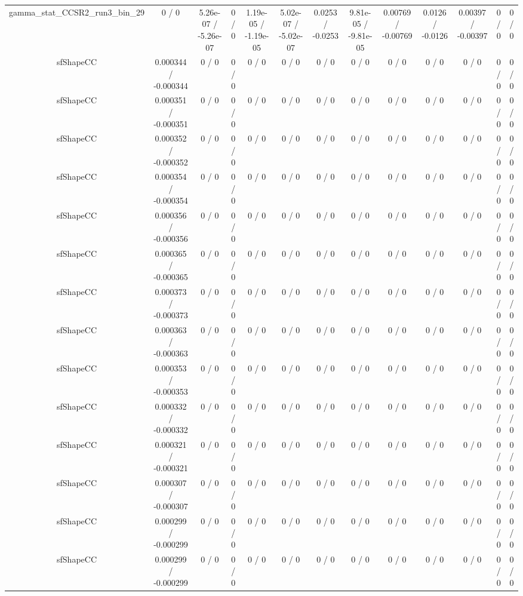 \documentclass[10pt]{article}
\begin{document}
\begin{table}[htbp]
\begin{center}
\begin{tabular}{|c|c|c|c|c|c|c|c|c|c|c|c|c|}
  gamma_stat_CCSR2_run3_bin_29 & 0 / 0 & 5.26e-07 / -5.26e-07 & 0 / 0 & 1.19e-05 / -1.19e-05 & 5.02e-07 / -5.02e-07 & 0.0253 / -0.0253 & 9.81e-05 / -9.81e-05 & 0.00769 / -0.00769 & 0.0126 / -0.0126 & 0.00397 / -0.00397 & 0 / 0 & 0 / 0 \\ 
  sfShapeCC & 0.000344 / -0.000344 & 0 / 0 & 0 / 0 & 0 / 0 & 0 / 0 & 0 / 0 & 0 / 0 & 0 / 0 & 0 / 0 & 0 / 0 & 0 / 0 & 0 / 0 \\ 
  sfShapeCC & 0.000351 / -0.000351 & 0 / 0 & 0 / 0 & 0 / 0 & 0 / 0 & 0 / 0 & 0 / 0 & 0 / 0 & 0 / 0 & 0 / 0 & 0 / 0 & 0 / 0 \\ 
  sfShapeCC & 0.000352 / -0.000352 & 0 / 0 & 0 / 0 & 0 / 0 & 0 / 0 & 0 / 0 & 0 / 0 & 0 / 0 & 0 / 0 & 0 / 0 & 0 / 0 & 0 / 0 \\ 
  sfShapeCC & 0.000354 / -0.000354 & 0 / 0 & 0 / 0 & 0 / 0 & 0 / 0 & 0 / 0 & 0 / 0 & 0 / 0 & 0 / 0 & 0 / 0 & 0 / 0 & 0 / 0 \\ 
  sfShapeCC & 0.000356 / -0.000356 & 0 / 0 & 0 / 0 & 0 / 0 & 0 / 0 & 0 / 0 & 0 / 0 & 0 / 0 & 0 / 0 & 0 / 0 & 0 / 0 & 0 / 0 \\ 
  sfShapeCC & 0.000365 / -0.000365 & 0 / 0 & 0 / 0 & 0 / 0 & 0 / 0 & 0 / 0 & 0 / 0 & 0 / 0 & 0 / 0 & 0 / 0 & 0 / 0 & 0 / 0 \\ 
  sfShapeCC & 0.000373 / -0.000373 & 0 / 0 & 0 / 0 & 0 / 0 & 0 / 0 & 0 / 0 & 0 / 0 & 0 / 0 & 0 / 0 & 0 / 0 & 0 / 0 & 0 / 0 \\ 
  sfShapeCC & 0.000363 / -0.000363 & 0 / 0 & 0 / 0 & 0 / 0 & 0 / 0 & 0 / 0 & 0 / 0 & 0 / 0 & 0 / 0 & 0 / 0 & 0 / 0 & 0 / 0 \\ 
  sfShapeCC & 0.000353 / -0.000353 & 0 / 0 & 0 / 0 & 0 / 0 & 0 / 0 & 0 / 0 & 0 / 0 & 0 / 0 & 0 / 0 & 0 / 0 & 0 / 0 & 0 / 0 \\ 
  sfShapeCC & 0.000332 / -0.000332 & 0 / 0 & 0 / 0 & 0 / 0 & 0 / 0 & 0 / 0 & 0 / 0 & 0 / 0 & 0 / 0 & 0 / 0 & 0 / 0 & 0 / 0 \\ 
  sfShapeCC & 0.000321 / -0.000321 & 0 / 0 & 0 / 0 & 0 / 0 & 0 / 0 & 0 / 0 & 0 / 0 & 0 / 0 & 0 / 0 & 0 / 0 & 0 / 0 & 0 / 0 \\ 
  sfShapeCC & 0.000307 / -0.000307 & 0 / 0 & 0 / 0 & 0 / 0 & 0 / 0 & 0 / 0 & 0 / 0 & 0 / 0 & 0 / 0 & 0 / 0 & 0 / 0 & 0 / 0 \\ 
  sfShapeCC & 0.000299 / -0.000299 & 0 / 0 & 0 / 0 & 0 / 0 & 0 / 0 & 0 / 0 & 0 / 0 & 0 / 0 & 0 / 0 & 0 / 0 & 0 / 0 & 0 / 0 \\ 
  sfShapeCC & 0.000299 / -0.000299 & 0 / 0 & 0 / 0 & 0 / 0 & 0 / 0 & 0 / 0 & 0 / 0 & 0 / 0 & 0 / 0 & 0 / 0 & 0 / 0 & 0 / 0 \\ 

\end{tabular}
\end{center}
\end{table}
\end{document}

